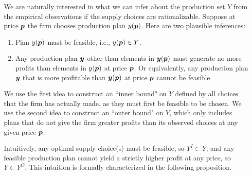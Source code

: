 We are naturally interested in what we can infer about the production set \(Y\) from the empirical observations if the supply choices are rationalizable. Suppose at price \(\bm p\) the firm chooses production plan \(y(\bm p)\).
Here are two plausible inferences:

\begin{enumerate}
\item
  Plan \(y(\bm p)\) must be feasible, i.e., \(y(\bm p)\in Y\).
\item
  Any production plan \(\bm y\) other than elements in \(\bm y(\bm p)\) must
  generate no more profits than elements in \(y(\bm p)\) at price \(\bm p\).
  Or equivalently, any production plan \(\bm y\) that is more profitable
  than \(\bm y(\bm p)\) at price \(\bm p\) cannot be feasible.
\end{enumerate}

We use the first idea to construct an ``inner bound" on \(Y\) defined by all choices that the firm has actually made, as they must first be feasible to be chosen. We use the
second idea to construct an ``outer bound" on \(Y\), which only includes
plans that do not give the firm greater profits than its observed choices at any given price \(\bm p\).


Intuitively, any optimal supply choice(s) must be feasible, so
\(Y^I\subset Y\); and any feasible production plan cannot yield a
strictly higher profit at any price, so \(Y\subset Y^O\). This intuition is formally characterized in the following proposition.

